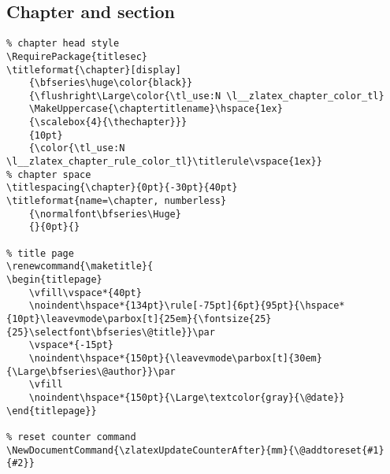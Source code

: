 \subsection{Chapter and section}
\begin{verbatim}
% chapter head style
\RequirePackage{titlesec}
\titleformat{\chapter}[display]
    {\bfseries\huge\color{black}}
    {\flushright\Large\color{\tl_use:N \l__zlatex_chapter_color_tl}
    \MakeUppercase{\chaptertitlename}\hspace{1ex}
    {\scalebox{4}{\thechapter}}}
    {10pt}
    {\color{\tl_use:N \l__zlatex_chapter_rule_color_tl}\titlerule\vspace{1ex}}
% chapter space
\titlespacing{\chapter}{0pt}{-30pt}{40pt}
\titleformat{name=\chapter, numberless}
    {\normalfont\bfseries\Huge}
    {}{0pt}{}

% title page
\renewcommand{\maketitle}{
\begin{titlepage}
    \vfill\vspace*{40pt}
    \noindent\hspace*{134pt}\rule[-75pt]{6pt}{95pt}{\hspace*{10pt}\leavevmode\parbox[t]{25em}{\fontsize{25}{25}\selectfont\bfseries\@title}}\par
    \vspace*{-15pt}
    \noindent\hspace*{150pt}{\leavevmode\parbox[t]{30em}{\Large\bfseries\@author}}\par
    \vfill
    \noindent\hspace*{150pt}{\Large\textcolor{gray}{\@date}}
\end{titlepage}} 

% reset counter command
\NewDocumentCommand{\zlatexUpdateCounterAfter}{mm}{\@addtoreset{#1}{#2}}
\end{verbatim}
